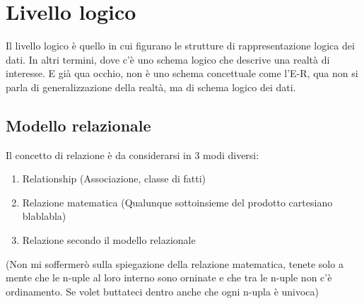 \documentclass[12pt, a4paper, openany, twoside]{book}
\begin{document}
\chapter{Livello logico}
Il livello logico è quello in cui figurano le strutture di rappresentazione 
logica dei dati. In altri termini, dove c'è uno schema logico che descrive una
realtà di interesse. E già qua occhio, non è uno schema concettuale come l'E-R,
qua non si parla di generalizzazione della realtà, ma di schema logico dei dati. 
\section{Modello relazionale}
Il concetto di relazione è da considerarsi in 3 modi diversi:
\begin{enumerate}
	\item Relationship (Associazione, classe di fatti)
	\item Relazione matematica (Qualunque sottoinsieme del prodotto cartesiano 
	blablabla)
	\item Relazione secondo il modello relazionale
\end{enumerate}
(Non mi soffermerò sulla spiegazione della relazione matematica, tenete solo
a mente che le n-uple al loro interno sono orninate e che tra le n-uple non c'è
ordinamento. Se volet buttateci dentro anche che ogni n-upla è univoca)
\end{document}
